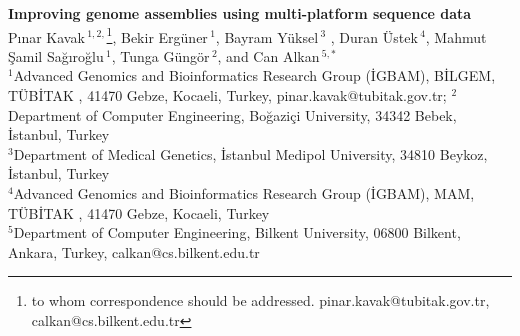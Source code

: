 \documentclass[12pt]{article}
\begin{document}
 \renewcommand{\thefootnote}{\fnsymbol{footnote}} 

\begin{center}
  {\bf Improving genome assemblies using multi-platform sequence data}\\

  P\i nar Kavak\,$^{1,2,}$\footnote{to whom correspondence should be addressed. pinar.kavak@tubitak.gov.tr, calkan@cs.bilkent.edu.tr},  Bekir Erg\"{u}ner\,$^{1}$, Bayram Y\"{u}ksel\,$^{3}$ , Duran \"{U}stek\,$^{4}$, Mahmut \c{S}amil Sa\u{g}\i ro\u{g}lu\,$^1$, 
  Tunga G\"{u}ng\"{o}r\,$^{2}$, and 
  Can Alkan\,$^{5,*}$ \\ 

  {\scriptsize
  $^{1}$Advanced Genomics and Bioinformatics Research Group (\.{I}GBAM), B\.{I}LGEM, %
  T\"{U}B\.{I}TAK%
, 41470 Gebze, Kocaeli, Turkey, pinar.kavak@tubitak.gov.tr;
  $^{2}$Department of Computer Engineering, Bo\u{g}azi\c{c}i University, 34342 Bebek, \.{I}stanbul, Turkey\\
  $^{3}$Department of Medical Genetics, \.{I}stanbul Medipol University, 34810 Beykoz, \.{I}stanbul, Turkey\\
  $^{4}$Advanced Genomics and Bioinformatics Research Group (\.{I}GBAM), MAM,%
  T\"{U}B\.{I}TAK%
, 41470 Gebze, Kocaeli, Turkey\\
  $^{5}$Department of Computer Engineering, Bilkent University, 06800 Bilkent, Ankara, Turkey, calkan@cs.bilkent.edu.tr
  }
\end{center}

\begin{abstract}
\textit{De novo} assembly  using short reads generated by next generation sequencing technologies is still an open problem. Although there are several assembly algorithms developed for data generated with different sequencing technologies, and some that can make use of hybrid data, the assemblies are still far from being perfect. There is still a need for computational approaches to improve draft assemblies.
Here we propose a new method to correct assembly mistakes when there are multiple types of data obtained using different sequencing technologies that have different strengths and biases.
We apply our method to Illumina, 454, and Ion Torrent data, and also compare our results with existing hybrid assemblers, Celera and Masurca.
\end{abstract}
\end{document}
